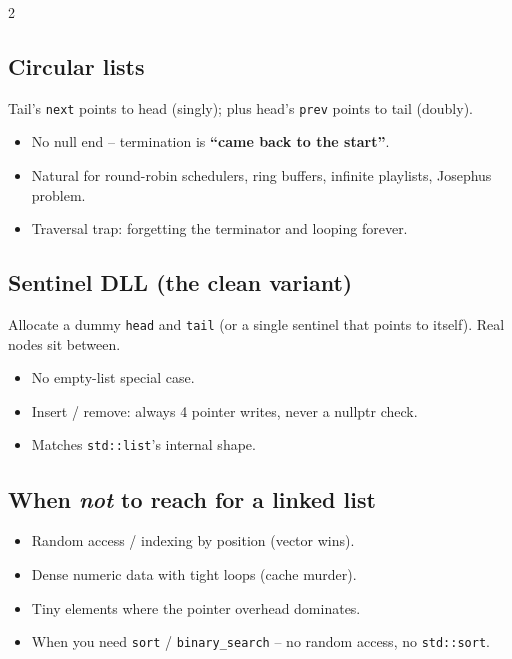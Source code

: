 \documentclass[10pt]{article}
\begin{document}
\begin{multicols}{2}
\subsection*{Circular lists}
Tail's \texttt{next} points to head (singly); plus head's
\texttt{prev} points to tail (doubly).
\begin{itemize}
    \item No null end -- termination is \textbf{``came back to the start''}.
    \item Natural for round-robin schedulers, ring buffers,
    infinite playlists, Josephus problem.
    \item Traversal trap: forgetting the terminator and looping
    forever.
\end{itemize}

\subsection*{Sentinel DLL (the clean variant)}
Allocate a dummy \texttt{head} and \texttt{tail} (or a single
sentinel that points to itself). Real nodes sit between.
\begin{itemize}
    \item No empty-list special case.
    \item Insert / remove: always 4 pointer writes, never a nullptr check.
    \item Matches \texttt{std::list}'s internal shape.
\end{itemize}

\subsection*{When \emph{not} to reach for a linked list}
\begin{itemize}
    \item Random access / indexing by position (vector wins).
    \item Dense numeric data with tight loops (cache murder).
    \item Tiny elements where the pointer overhead dominates.
    \item When you need \texttt{sort} / \texttt{binary\_search} --
    no random access, no \texttt{std::sort}.
\end{itemize}


\end{multicols}
\end{document}
